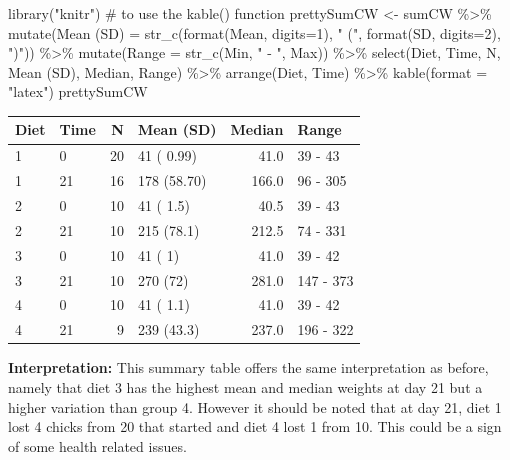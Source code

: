 \documentclass[
  letterpaper,
  DIV=11,
  numbers=noendperiod]{scrreprt}
\newenvironment{Shaded}{\begin{snugshade}}{\end{snugshade}}
\newcommand{\AttributeTok}[1]{\textcolor[rgb]{0.40,0.45,0.13}{#1}}
\newcommand{\CommentTok}[1]{\textcolor[rgb]{0.37,0.37,0.37}{#1}}
\newcommand{\DecValTok}[1]{\textcolor[rgb]{0.68,0.00,0.00}{#1}}
\newcommand{\FunctionTok}[1]{\textcolor[rgb]{0.28,0.35,0.67}{#1}}
\newcommand{\NormalTok}[1]{\textcolor[rgb]{0.00,0.23,0.31}{#1}}
\newcommand{\OtherTok}[1]{\textcolor[rgb]{0.00,0.23,0.31}{#1}}
\newcommand{\SpecialCharTok}[1]{\textcolor[rgb]{0.37,0.37,0.37}{#1}}
\newcommand{\StringTok}[1]{\textcolor[rgb]{0.13,0.47,0.30}{#1}}
\theoremstyle{definition}
\theoremstyle{plain}
\theoremstyle{plain}
\theoremstyle{remark}
\begin{document}
\begin{Shaded}
\begin{Highlighting}[]
\FunctionTok{library}\NormalTok{(}\StringTok{"knitr"}\NormalTok{) }\CommentTok{\# to use the kable() function}
\NormalTok{prettySumCW }\OtherTok{\textless{}{-}}\NormalTok{ sumCW }\SpecialCharTok{\%\textgreater{}\%} 
 \FunctionTok{mutate}\NormalTok{(}\StringTok{\textasciigrave{}}\AttributeTok{Mean (SD)}\StringTok{\textasciigrave{}} \OtherTok{=} \FunctionTok{str\_c}\NormalTok{(}\FunctionTok{format}\NormalTok{(Mean, }\AttributeTok{digits=}\DecValTok{1}\NormalTok{),}
           \StringTok{" ("}\NormalTok{, }\FunctionTok{format}\NormalTok{(SD, }\AttributeTok{digits=}\DecValTok{2}\NormalTok{), }\StringTok{")"}\NormalTok{)) }\SpecialCharTok{\%\textgreater{}\%} 
 \FunctionTok{mutate}\NormalTok{(}\AttributeTok{Range =} \FunctionTok{str\_c}\NormalTok{(Min, }\StringTok{" {-} "}\NormalTok{, Max)) }\SpecialCharTok{\%\textgreater{}\%} 
 \FunctionTok{select}\NormalTok{(Diet, Time, N, }\StringTok{\textasciigrave{}}\AttributeTok{Mean (SD)}\StringTok{\textasciigrave{}}\NormalTok{, Median, Range) }\SpecialCharTok{\%\textgreater{}\%}
 \FunctionTok{arrange}\NormalTok{(Diet, Time) }\SpecialCharTok{\%\textgreater{}\%} 
 \FunctionTok{kable}\NormalTok{(}\AttributeTok{format =} \StringTok{"latex"}\NormalTok{)}
\NormalTok{prettySumCW}
\end{Highlighting}
\end{Shaded}

\begin{tabular}{l|l|r|l|r|l}
\hline
Diet & Time & N & Mean (SD) & Median & Range\\
\hline
1 & 0 & 20 & 41 ( 0.99) & 41.0 & 39 - 43\\
\hline
1 & 21 & 16 & 178 (58.70) & 166.0 & 96 - 305\\
\hline
2 & 0 & 10 & 41 ( 1.5) & 40.5 & 39 - 43\\
\hline
2 & 21 & 10 & 215 (78.1) & 212.5 & 74 - 331\\
\hline
3 & 0 & 10 & 41 ( 1) & 41.0 & 39 - 42\\
\hline
3 & 21 & 10 & 270 (72) & 281.0 & 147 - 373\\
\hline
4 & 0 & 10 & 41 ( 1.1) & 41.0 & 39 - 42\\
\hline
4 & 21 & 9 & 239 (43.3) & 237.0 & 196 - 322\\
\hline
\end{tabular}

\textbf{Interpretation:} This summary table offers the same
interpretation as before, namely that diet 3 has the highest mean and
median weights at day 21 but a higher variation than group 4. However it
should be noted that at day 21, diet 1 lost 4 chicks from 20 that
started and diet 4 lost 1 from 10. This could be a sign of some health
related issues.
\end{document}
